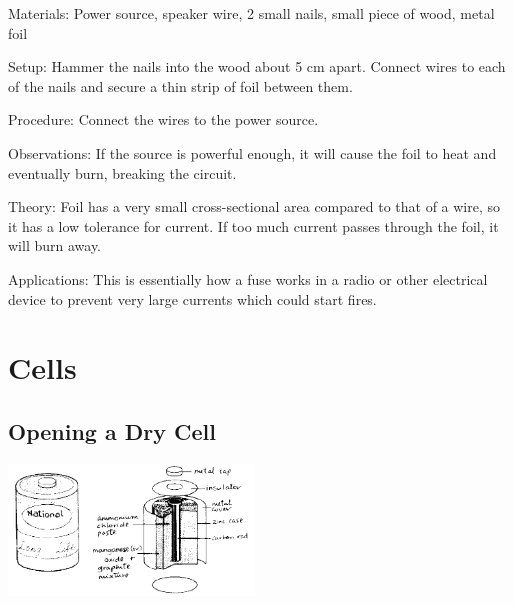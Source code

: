 \begin{multicols}{2}
\begin{description*}
\item[Materials:]{Power source, speaker wire, 2 small nails, small piece of wood, metal foil}
\item[Setup:]{Hammer the nails into the wood about 5 cm apart. Connect wires to each of the nails and secure a thin strip of foil between them.}
\item[Procedure:]{Connect the wires to the power source.}
\item[Observations:]{If the source is powerful enough, it will cause the foil to heat and eventually burn, breaking the circuit.}
\item[Theory:]{Foil has a very small cross-sectional area compared to that of a wire, so it has a low tolerance for current. If too much current passes through the foil, it will burn away.}
\item[Applications:]{This is essentially how a fuse works in a radio or other electrical device to prevent very large currents which could start fires.}
\end{description*}


\section*{Cells}


\subsection{Opening a Dry Cell}

\begin{center}
\includegraphics[width=0.49\textwidth]{./img/source/dry-cell.png}
\end{center}


\end{multicols}
